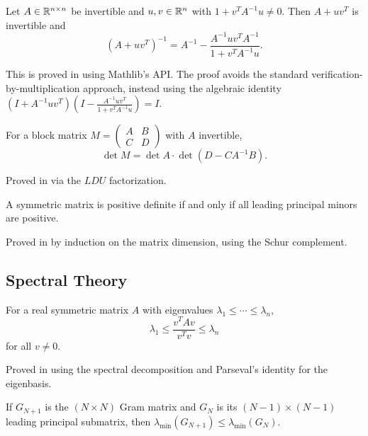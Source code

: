 \documentclass[11pt,a4paper]{article}
\begin{document}
\begin{theorem}
\label{thm:sm}
Let $A \in \mathbb{R}^{n \times n}$ be invertible and $u, v \in \mathbb{R}^n$ with
$1 + v^T A^{-1} u \neq 0$. Then $A + uv^T$ is invertible and
\[
  (A + uv^T)^{-1} = A^{-1} - \frac{A^{-1}uv^TA^{-1}}{1 + v^TA^{-1}u}.
\]
\end{theorem}

This is proved in  using
Mathlib's  API. The proof avoids the standard
verification-by-multiplication approach, instead using the algebraic
identity $(I + A^{-1}uv^T)(I - \frac{A^{-1}uv^T}{1+v^TA^{-1}u}) = I$.

\begin{theorem}
\label{thm:schur}
For a block matrix $M = \begin{pmatrix} A & B \\ C & D \end{pmatrix}$
with $A$ invertible,
\[
  \det M = \det A \cdot \det(D - CA^{-1}B).
\]
\end{theorem}

Proved in  via the
$LDU$ factorization.

\begin{theorem}
\label{thm:sylvester}
A symmetric matrix is positive definite if and only if all leading
principal minors are positive.
\end{theorem}

Proved in  by induction on the
matrix dimension, using the Schur complement.

\subsection{Spectral Theory}

\begin{theorem}
\label{thm:rayleigh}
For a real symmetric matrix $A$ with eigenvalues $\lambda_1 \leq \cdots \leq \lambda_n$,
\[
  \lambda_1 \leq \frac{v^T A v}{v^T v} \leq \lambda_n
\]
for all $v \neq 0$.
\end{theorem}

Proved in  using the spectral
decomposition and Parseval's identity for the eigenbasis.

\begin{theorem}
\label{thm:interlacing}
If $G_{N+1}$ is the $(N \times N)$ Gram matrix and $G_N$ is its
$(N-1) \times (N-1)$ leading principal submatrix, then
$\lambda_{\min}(G_{N+1}) \leq \lambda_{\min}(G_N)$.
\end{theorem}
\end{document}
